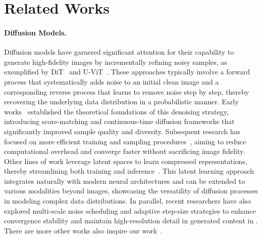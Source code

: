 \section{Related Works}
\paragraph{Diffusion Models.} Diffusion models have garnered significant attention for their capability to generate high-fidelity images by incrementally refining noisy samples, as exemplified by DiT~\cite{px23} and U-ViT~\cite{bnx+23}. These approaches typically involve a forward process that systematically adds noise to an initial clean image and a corresponding reverse process that learns to remove noise step by step, thereby recovering the underlying data distribution in a probabilistic manner. Early works~\cite{se19,sme20} established the theoretical foundations of this denoising strategy, introducing score-matching and continuous-time diffusion frameworks that significantly improved sample quality and diversity. Subsequent research has focused on more efficient training and sampling procedures~\cite{lzb+22,ssz+24_dit,ssz+24_pruning}, aiming to reduce computational overhead and converge faster without sacrificing image fidelity. Other lines of work leverage latent spaces to learn compressed representations, thereby streamlining both training and inference~\cite{rbl+22,hwsl24}. This latent learning approach integrates naturally with modern neural architectures and can be extended to various modalities beyond images, showcasing the versatility of diffusion processes in modeling complex data distributions. In parallel, recent researchers have also explored multi-scale noise scheduling and adaptive step-size strategies to enhance convergence stability and maintain high-resolution detail in generated content in \cite{lkw+24,fmzz24,rckc24,jzx+25,lyhz24}. There are more other works also inspire our work~\cite{xzc+22,dwb+23,pbd+23,wsd+23,wcz+23,ssz+24,ssz+24_prun,wxz+24,cl24,kkn24,cll+25,cll+25_deskreject,cxj24,wcy+23,fjl+24,lzw+24,hwl+24}.

